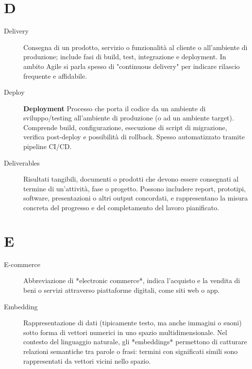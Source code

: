 \section*{D}
\begin{description}
    \item[Delivery] Consegna di un prodotto, servizio o funzionalità al cliente o all'ambiente di produzione; include fasi di build, test, integrazione e deployment. In ambito Agile si parla spesso di "continuous delivery" per indicare rilascio frequente e affidabile.
    \item[Deploy] \textbf{Deployment} Processo che porta il codice da un ambiente di sviluppo/testing all'ambiente di produzione (o ad un ambiente target). Comprende build, configurazione, esecuzione di script di migrazione, verifica post-deploy e possibilità di rollback. Spesso automatizzato tramite pipeline CI/CD.
    \item[Deliverables] Risultati tangibili, documenti o prodotti che devono essere consegnati al termine di un’attività, fase o progetto. Possono includere report, prototipi, software, presentazioni o altri output concordati, e rappresentano la misura concreta del progresso e del completamento del lavoro pianificato.
\end{description}

\section*{E}
\begin{description}
    \item[E-commerce] Abbreviazione di *electronic commerce*, indica l’acquisto e la vendita di beni o servizi attraverso piattaforme digitali, come siti web o app. 
    \item[Embedding] Rappresentazione di dati (tipicamente testo, ma anche immagini o suoni) sotto forma di vettori numerici in uno spazio multidimensionale.  
    Nel contesto del linguaggio naturale, gli *embeddings* permettono di catturare relazioni semantiche tra parole o frasi: termini con significati simili sono rappresentati da vettori vicini nello spazio.  
    
\end{description}

